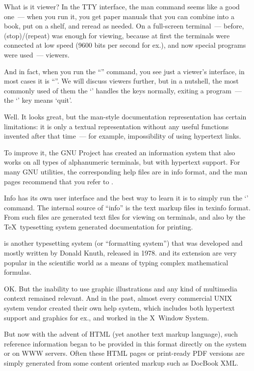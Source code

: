 What is it viewer? In the TTY interface, the man command seems like
a good one~--- when you run it, you get paper manuals that you can combine
into a book, put on a shelf, and reread as needed. On a full-screen terminal~---
before, (stop)/(repeat) was enough for viewing,
because at first the terminals were connected at low speed (9600 bits per
second for ex.), and now special programs were used~--- viewers.

And in fact, when you run the ``'' command, you see just a viewer's
interface, in most cases it is ``''. We will discuss viewers further,
but in a nutshell, the most commonly used of them the `' handles
the  keys normally, exiting a program~--- the `' key
means `quit'.

Well. It looks great, but the man-style documentation representation has
certain limitations: it is only a textual representation without any
useful functions invented after that time~--- for example, impossibility of
using hypertext links.

To improve it, the GNU Project has created an information system that
also works on all types of alphanumeric terminals, but with hypertext support.
For many GNU utilities, the corresponding help files are in info format,
and the man pages recommend that you refer to .

Info has its own user interface and the best way to learn it is to simply
run the `' command. The internal source of ``info'' is the text
markup files in texinfo format. From such files are generated text files
for viewing on terminals, and also by the \TeX\ typesetting system
generated documentation for printing.

\struct{\TeX} is another typesetting system (or ``formatting system'') that was
developed and mostly written by Donald Knuth, released in 1978. \struct{\TeX}
and its \struct{\LaTeX} extension are very popular in the scientific world
as a means of typing complex mathematical formulas.

OK. But the inability to use graphic illustrations and any kind of multimedia
context remained relevant. And in the past, almost every commercial UNIX system
vendor created their own help system, which includes both hypertext support
and graphics for ex., and worked in the X~Window System.

But now with the advent of HTML (yet another text markup language), such
reference information began to be provided in this format directly on
the system or on WWW servers. Often these HTML pages or print-ready PDF versions
are simply generated from some content oriented markup such as DocBook XML.
